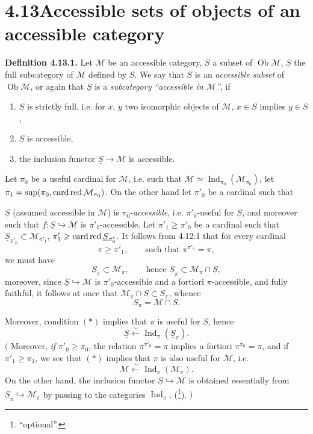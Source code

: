 \documentclass[11pt]{article}
\newcommand{\printedpage}[1]{\marginpar{\footnotesize p.~#1}}
\newcommand{\msp}[1]{\marginpar{\footnotesize [#1]}}
\newcommand{\M}{\mathcal{M}}
\newcommand{\Ind}{\operatorname{Ind}}
\newcommand{\Ob}{\operatorname{Ob}}
\newcommand{\card}{\operatorname{card}}
\newcommand{\red}{\mathop{\textup{red}}\nolimits}
\newcommand{\uS}{\underline{S}}
\begin{document}
\msp{page 281}

\section*{4.13\quad Accessible sets of objects of an accessible category}

\textbf{Definition 4.13.1.} Let $\M$ be an accessible category, $S$ a subset of $\Ob\M$, $\uS$ the full subcategory of $\M$ defined by $S$. We say that $S$ is an \textit{accessible subset} of $\Ob\M$, or again that $\uS$ is a \textit{subcategory ``accessible in $\M$''}, if
\printedpage{105}
\begin{enumerate}
\item[a)] $\uS$ is strictly full, i.e. for $x$, $y$ two isomorphic objects of $\M$, $x \in S$ implies $y \in S$,
\item[b)] $\uS$ is accessible,
\item[c)] the inclusion functor $\uS \longrightarrow \M$ is accessible.
\end{enumerate}
Let $\pi_0$ be a useful cardinal for $\M$, i.e. such that $\M \simeq \Ind_{\pi_0}(\M_{\pi_0})$, let $\pi_1 = \sup(\pi_0, \card\red\M_{\pi_0})$. On the other hand let $\pi'_0$ be a cardinal such that

\msp{page 282}
$\uS$ (assumed accessible in $\M$) is $\pi_0$-\textit{accessible}, i.e. $\pi'_0$-useful for $\uS$, and moreover such %
that $f : \uS \hookrightarrow \M$ is $\pi'_0$-accessible. Let $\pi'_1 \geqslant \pi'_0$ be a cardinal such that $\uS_{\pi'_0} \subset \M_{\pi'_1}$, $\pi'_1 \geqslant \card\red\uS_{\pi'_0}$. It follows from 4.12.1 that for every cardinal
\[
\pi \geqslant \pi'_1 , \qquad \text{such that } \pi^{\pi'_0} = \pi, \tag*{$(*)$}
\]
we must have
\[
\uS_\pi \subset \M_\pi , \qquad \text{hence } \uS_\pi \subset \M_\pi \cap \uS,
\]
moreover, since $\uS \hookrightarrow \M$ is $\pi'_0$-accessible and a fortiori $\pi$-accessible, and fully faithful, it follows at once that $\M_\pi \cap S \subset S_\pi$, whence
\[
S_\pi = \M \cap S . %
\]

\msp{page 283}
Moreover, condition $(*)$ implies that $\pi$ is useful for $\uS$, hence
\[
\uS \xleftarrow{\sim} \Ind_\pi(\uS_\pi) .
\]
$\Big($ Moreover, \textit{if} $\pi'_0 \geqslant \pi_0$, the relation $\pi^{\pi'_0} = \pi$ implies a fortiori $\pi^{\pi_0} = \pi$, and if $\pi'_1 \geqslant \pi_1$, we see that $(*)$ implies that $\pi$ is also useful for $\M$, i.e.
\[
\M \xleftarrow{\sim} \Ind_\pi(\M_\pi) .
\]
On the other hand, the inclusion functor $\uS \hookrightarrow \M$ is obtained essentially from $\uS_\pi \hookrightarrow \M_\pi$ by passing to the categories $\Ind_\pi$. (\footnote[116]{ ``optional''.}). $\Big)$
\end{document}

